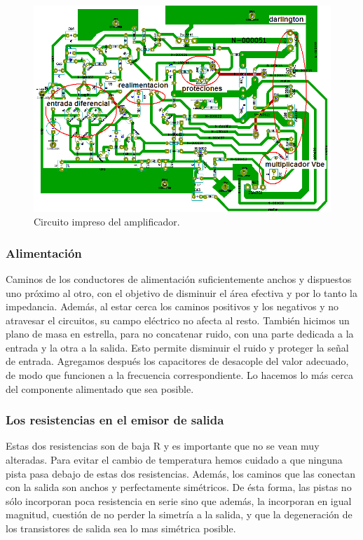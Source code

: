\begin{figure}[H]
\centering
\includegraphics[width=\textwidth]{img/PCB2.png}
\caption{Circuito impreso del amplificador.}
\end{figure}

\subsubsection*{Alimentación}
Caminos de los conductores de alimentación suficientemente anchos y  dispuestos uno próximo al otro, con el objetivo de disminuir el área efectiva y por lo tanto la impedancia. Además, al estar cerca los caminos positivos y los negativos y no atravesar el circuitos, su campo eléctrico no afecta al resto.
También hicimos un plano de masa en estrella, para no concatenar ruido, con una parte dedicada a la entrada y la otra a la salida. Esto permite disminuir el ruido y proteger la señal de entrada.
 Agregamos después los capacitores de desacople del valor adecuado, de modo que funcionen a la frecuencia correspondiente. Lo hacemos lo más cerca del componente alimentado que sea posible.

\subsubsection*{Los resistencias en el emisor de salida}
Estas dos resistencias son de baja R y es importante que no se vean muy alteradas. Para evitar el cambio de temperatura hemos cuidado a que ninguna pista pasa debajo de estas dos resistencias. Además, los caminos que las conectan con la salida son anchos y perfectamente simétricos. De ésta forma, las pistas no sólo incorporan poca resistencia en serie sino que además, la incorporan en igual magnitud, cuestión de no perder la simetría a la salida, y que la degeneración de los transistores de salida sea lo mas simétrica posible.

